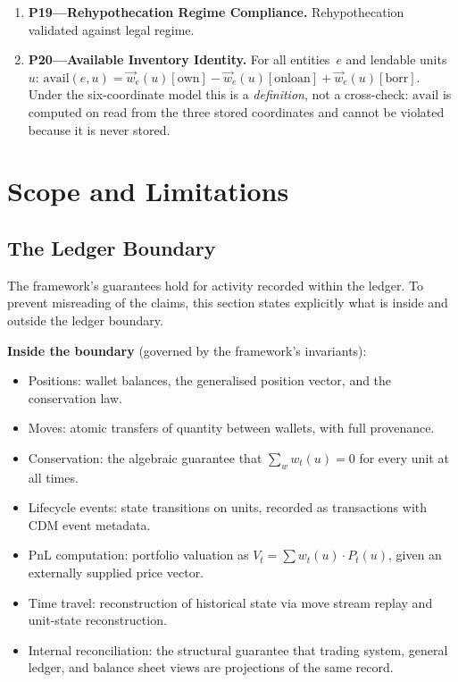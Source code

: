 \documentclass[11pt,a4paper]{article}
\begin{document}
\begin{enumerate}
\item \textbf{P19---Rehypothecation Regime Compliance.} Rehypothecation validated against legal regime.

\item \textbf{P20---Available Inventory Identity.} For all entities~$e$ and lendable units~$u$: $\mathrm{avail}(e,u) = \vec{w}_e(u)[\mathrm{own}] - \vec{w}_e(u)[\mathrm{onloan}] + \vec{w}_e(u)[\mathrm{borr}]$. Under the six-coordinate model this is a \emph{definition}, not a cross-check: $\mathrm{avail}$ is computed on read from the three stored coordinates and cannot be violated because it is never stored.
\end{enumerate}

\clearpage
\section{Scope and Limitations}
\label{sec:scope-limitations}

\subsection{The Ledger Boundary}

The framework's guarantees hold for activity recorded within the ledger. To prevent misreading of the claims, this section states explicitly what is inside and outside the ledger boundary.

\medskip
\noindent\textbf{Inside the boundary} (governed by the framework's invariants):
\begin{itemize}[nosep]
\item Positions: wallet balances, the generalised position vector, and the conservation law.
\item Moves: atomic transfers of quantity between wallets, with full provenance.
\item Conservation: the algebraic guarantee that $\sum_w w_t(u) = 0$ for every unit at all times.
\item Lifecycle events: state transitions on units, recorded as transactions with CDM event metadata.
\item PnL computation: portfolio valuation as $V_t = \sum w_t(u) \cdot P_t(u)$, given an externally supplied price vector.
\item Time travel: reconstruction of historical state via move stream replay and unit-state reconstruction.
\item Internal reconciliation: the structural guarantee that trading system, general ledger, and balance sheet views are projections of the same record.
\end{itemize}
\end{document}

